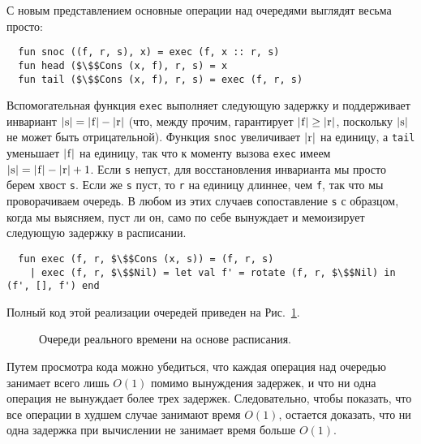 С новым представлением основные операции над очередями выглядят весьма
просто:
\begin{lstlisting}
  fun snoc ((f, r, s), x) = exec (f, x :: r, s)
  fun head ($\$$Cons (x, f), r, s) = x
  fun tail ($\$$Cons (x, f), r, s) = exec (f, r, s)
\end{lstlisting}
Вспомогательная функция \lstinline!exec! выполняет следующую задержку
и поддерживает инвариант $|\lstinline!s!| = |\lstinline!f!| -
|\lstinline!r!|$ (что, между прочим, гарантирует $|\lstinline!f!| \ge
|\lstinline!r!|$, поскольку $|\lstinline!s!|$ не может быть
отрицательной). Функция \lstinline!snoc! увеличивает $|\lstinline!r!|$
на единицу, а \lstinline!tail! уменьшает $|\lstinline!f!|$ на единицу,
так что к моменту вызова \lstinline!exec! имеем $|\lstinline!s!| =
|\lstinline!f!| - |\lstinline!r!| + 1$. Если \lstinline!s! непуст,
для восстановления инварианта мы просто берем хвост
\lstinline!s!. Если же \lstinline!s! пуст, то \lstinline!r! на
единицу длиннее, чем \lstinline!f!, так что мы проворачиваем
очередь. В любом из этих случаев сопоставление \lstinline!s! с
образцом, когда мы выясняем, пуст ли он, само по себе вынуждает и мемоизирует
следующую задержку в расписании.
\begin{lstlisting}
  fun exec (f, r, $\$$Cons (x, s)) = (f, r, s)
    | exec (f, r, $\$$Nil) = let val f' = rotate (f, r, $\$$Nil) in (f', [], f') end
\end{lstlisting}
Полный код этой реализации очередей приведен на Рис.~\ref{fig:7.1}.

\begin{figure}
  \centering
  
  \caption{Очереди реального времени на основе расписания.}
  \label{fig:7.1}
\end{figure}

Путем просмотра кода можно убедиться, что каждая операция над очередью
занимает всего лишь $O(1)$ помимо вынуждения задержек, и что ни одна
операция не вынуждает более трех задержек.  Следовательно, чтобы
показать, что все операции в худшем случае занимают время $O(1)$,
остается доказать, что ни одна задержка при вычислении не занимает
время больше $O(1)$.

